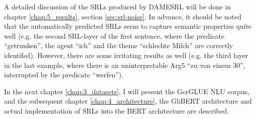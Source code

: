 A detailed discussion of the SRLs produced by DAMESRL will be done in chapter
\ref{chap:5_results}, section \ref{sec:srl-noise}. In advance, it should be
noted that the automatically predicted SRLs seem to capture semantic properties
quite well (e.g. the second SRL-layer of the first sentence, where the predicate
``getrunken'', the agent ``ich'' and the theme ``schlechte Milch'' are correctly
identifed). However, there are some irritating results as well (e.g. the third
layer in the last example, where there is an uninterpretable Arg5 ``zu von einem
30'', interrupted by the predicate ``werfen'').

In the next chapter \ref{chap:3_datasets}, I will present the GerGLUE NLU corpus, and
the subsequent chapter \ref{chap:4_architecture}, the GliBERT architecture and actual
implementation of SRLs into the BERT architecture are described.


